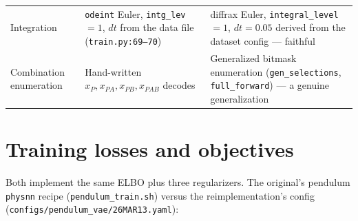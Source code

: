\documentclass[11pt,a4paper]{article}
\newcommand{\code}[1]{\texttt{#1}}
\begin{document}
\begin{table}[h]
\begin{tabularx}{\textwidth}{LXX}
Integration & \code{odeint} Euler, \code{intg\_lev} $= 1$, $dt$ from the data file (\code{train.py:69--70}) & diffrax Euler, \code{integral\_level} $= 1$, $dt = 0.05$ derived from the dataset config --- faithful \\
Combination enumeration & Hand-written $x_P, x_{PA}, x_{PB}, x_{PAB}$ decodes & Generalized bitmask enumeration (\code{gen\_selections}, \code{full\_forward}) --- a genuine generalization \\
\bottomrule
\end{tabularx}
\end{table}

\section{Training losses and objectives}
\label{sec:losses}

Both implement the same ELBO plus three regularizers. The original's pendulum
\code{physnn} recipe (\code{pendulum\_train.sh}) versus the reimplementation's
config (\code{configs/pendulum\_vae/26MAR13.yaml}):
\end{document}
